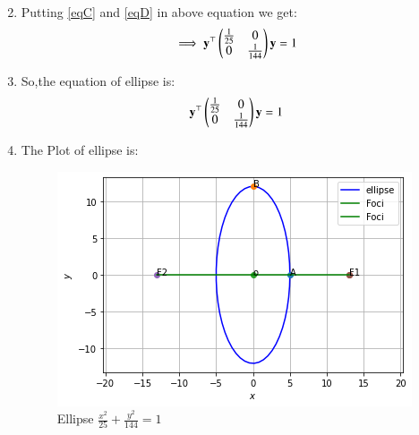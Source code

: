 \documentclass[journal,12pt,twocolumn]{IEEEtran}
\begin{document}
\begin{enumerate}
\begin{align}
\end{align}
\item Putting \eqref{eqC} and \eqref{eqD} in above equation we get:
\begin{align}
\implies \mathbf{y}^{\top}\begin{pmatrix}\frac{1}{25}& 0 \\ 0 & \frac{1}{144}\end{pmatrix}\mathbf{y}=1
\end{align}
\item So,the equation of ellipse is:
\begin{align}
     \mathbf{y}^{\top}\begin{pmatrix}\frac{1}{25}& 0 \\ 0 & \frac{1}{144}\end{pmatrix}\mathbf{y}=1
\end{align}
\item The Plot of ellipse is:
\begin{figure}[!ht]
    \centering
    \includegraphics[width=\columnwidth]{figure6.png}
    \caption{Ellipse $\frac{x^2}{25} + \frac{y^2}{144} = 1$}
    \label{fig:ellipse}
\end{figure} 
\end{enumerate}
\end{document}
